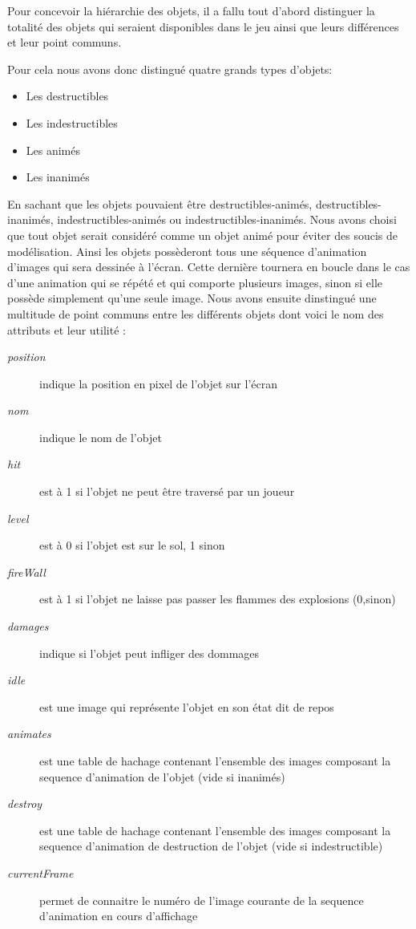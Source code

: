 		Pour concevoir la hiérarchie des objets, il a fallu tout d'abord 
		distinguer la totalité des objets qui seraient disponibles dans 
		le jeu ainsi que leurs différences et leur point communs.
		
		Pour cela nous avons donc distingué quatre grands types d'objets:
		\begin{itemize}
		  \item Les destructibles
		  \item Les indestructibles
		  \item Les animés
		  \item Les inanimés
		\end{itemize}
		
		En sachant que les objets pouvaient être destructibles-animés, 
		destructibles-inanimés, indestructibles-animés ou indestructibles-inanimés.
		Nous avons choisi que tout objet serait considéré comme un objet animé 
		pour éviter des soucis de modélisation.
		Ainsi les objets possèderont tous une séquence d'animation d'images qui
		 sera dessinée à l'écran.
		Cette dernière tournera en boucle dans le cas d'une animation 
		qui se répété et qui comporte plusieurs images, sinon si elle possède 
		simplement qu'une seule image.
		Nous avons ensuite dinstingué une multitude de point communs entre 
		les différents objets dont voici le nom des attributs et leur utilité : 
	
	\begin{description}
		\item [\textit{position}]{indique la position en pixel de l'objet sur l'écran}
		\item [\textit{nom}]{indique le nom de l'objet}
		\item [\textit{hit}]{est à 1 si l'objet ne peut être traversé par un joueur}
		\item [\textit{level}]{est à 0 si l'objet est sur le sol, 1 sinon}
		\item [\textit{fireWall}]{est à 1 si l'objet ne laisse pas passer les flammes des explosions (0,sinon)}
		\item [\textit{damages}]{indique si l'objet peut infliger des dommages}
		\item [\textit{idle}]{est une image qui représente l'objet en son état dit de repos}
		\item [\textit{animates}]{est une table de hachage contenant l'ensemble des images composant la sequence d'animation de l'objet (vide si inanimés)}
		\item [\textit{destroy}]{est une table de hachage contenant l'ensemble des images composant la sequence d'animation de destruction de l'objet (vide si indestructible)}
		\item [\textit{currentFrame}]{permet de connaitre le numéro de l'image courante de la sequence d'animation en cours d'affichage}
	\end{description}

